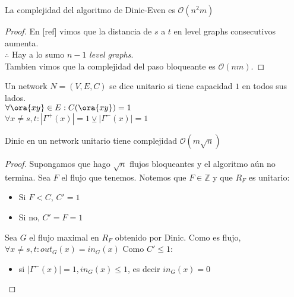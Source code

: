 \begin{theorem}
La complejidad del algoritmo de Dinic-Even es $\mathcal{O}(n^2 m)$
\end{theorem}
\begin{proof}
En [ref] vimos que la distancia de $s$ a $t$ en level graphs consecutivos aumenta.\\
$\therefore$ Hay a lo sumo $n-1$ \textit{level graphs}.\\
Tambien vimos que la complejidad del paso bloqueante es $\mathcal{O}(nm)$.
\end{proof}

\begin{definition}
Un network $N = (V,E,C)$ se dice unitario si tiene capacidad $1$ en todos sus lados.\\
$\forall \ora{xy} \in E : C(\ora{xy}) = 1$ \\
$\forall x \neq s,t : |\Gamma^+(x)| = 1 \veebar |\Gamma^-(x)| = 1$
\end{definition}
\begin{theorem}
Dinic en un network unitario tiene complejidad $\mathcal{O}(m\sqrt{n})$
\end{theorem}

\begin{proof}
Supongamos que hago $\sqrt{n}$ flujos bloqueantes y el algoritmo aún no termina.
Sea $F$ el flujo que tenemos. Notemos que $F \in \mathbb{Z}$ y que $R_F$ es unitario:
\begin{itemize}
    \item Si $F < C$, $C' = 1$
    \item Si no, $C' = F = 1$
\end{itemize}
Sea $G$ el flujo maximal en $R_F$ obtenido por Dinic.
Como es flujo, $\forall x \neq s,t : out_G(x) = in_G(x)$
Como $C' \le 1$:
\begin{itemize}
    \item si $|\Gamma^-(x)| = 1, in_G(x) \le 1$, es decir $in_G(x) = 0$
\end{itemize}
\end{proof}

